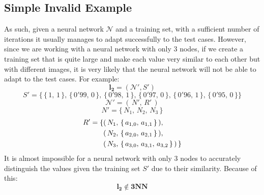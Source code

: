\documentclass[../main]{subfiles}
\begin{document}
\subsection{Simple Invalid Example}
As such, given a neural network $\mathcal{N}$ and a training set, with a sufficient number of iterations it usually manages to adapt successfully to the test cases. However, since we are working with a neural network with only 3 nodes, if we create a training set that is quite large and make each value very similar to each other but with different images, it is very likely that the neural network will not be able to adapt to the test cases. For example:
\begin{equation*}
    \textbf{l}_\textbf{2} = (\mathcal{N}', S')
\end{equation*}
\begin{equation*}
  S' = \{ \, \{ \, 1,\,1 \,\}, \, \{ \, 0'99,\,0 \,\}, \, \{ \, 0'98,\,1 \,\}, \, \{ \, 0'97,\,0 \,\}, \, \{ \, 0'96,\,1 \,\}, \, \{ \, 0'95,\,0 \,\} \}
\end{equation*}
\begin{equation*}
    \mathcal{N}' = (\, N',\, R' \, )
\end{equation*}
\begin{equation*}
   N' = \{ \, N_1,\, N_2,\, N_3 \, \}
\end{equation*}
\begin{equation*}
\begin{aligned}
   R' = \{ & (\,N_1, \, \{ \, a_{1,0}, \, a_{1,1} \, \}\,), \\
          & (\,N_2, \, \{ \, a_{2,0}, \, a_{2,1} \, \}\,), \\
          & (\,N_3, \, \{ \, a_{3,0}, \,a_{3,1}, \, a_{3,2} \, \}\,) \, \}
\end{aligned} \vspace{2mm}
\end{equation*}
It is almost impossible for a neural network with only 3 nodes to accurately distinguish the values given the training set $S'$ due to their similarity. Because of this:
\begin{equation*}
   \textbf{l}_\textbf{2} \notin \textbf{3NN}
\end{equation*}
\end{document}
